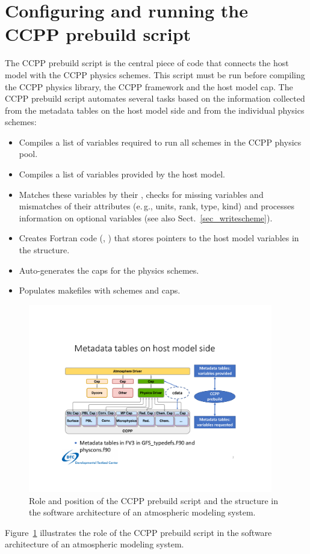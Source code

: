 \section{Configuring and running the CCPP prebuild script}
\label{sec_ccpp_prebuild_config}
The CCPP prebuild script  is the central piece of code that connects the host model with the CCPP physics schemes. This script must be run before compiling the CCPP physics library, the CCPP framework and the host model cap. The CCPP prebuild script automates several tasks based on the information collected from the metadata tables on the host model side and from the individual physics schemes:
\begin{itemize}
\item Compiles a list of variables required to run all schemes in the CCPP physics pool.
\item Compiles a list of variables provided by the host model.
\item Matches these variables by their , checks for missing variables and mismatches of their attributes (e.\,g., units, rank, type, kind) and processes information on optional variables (see also Sect.~\ref{sec_writescheme}).
\item Creates Fortran code (, ) that stores pointers to the host model variables in the  structure.
\item Auto-generates the caps for the physics schemes.
\item Populates makefiles with schemes and caps.
\end{itemize}
\begin{figure}[h]
\centerline{\includegraphics[width=0.95\textwidth]{./images/ccpp_design_with_ccpp_prebuild.pdf}}
\caption{Role and position of the CCPP prebuild script and the  structure in the software architecture of an atmospheric modeling system.}\label{fig_ccpp_design_with_ccpp_prebuild}
\end{figure}
Figure~\ref{fig_ccpp_design_with_ccpp_prebuild} illustrates the role of the CCPP prebuild script in the software architecture of an atmospheric modeling system.

